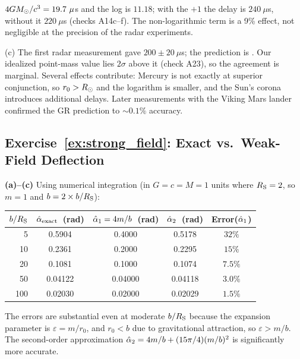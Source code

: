 \begin{annotation}
$4GM_{\odot}/c^3 = 19.7~\mu$s and the log is $11.18$; with the
$+1$ the delay is $240~\mu$s, without it $220~\mu$s (checks A14c--f).  The
non-logarithmic term is a 9\% effect, not negligible at the precision of the
radar experiments.
\end{annotation}
(c) The first radar measurement \citep{shapiro_1968} gave
$200 \pm 20~\mu$s; the prediction is \citet{shapiro_1964}.  Our idealized point-mass value lies $2\sigma$ above it
(check A23), so the agreement is marginal.  Several effects contribute:
Mercury is not exactly at superior conjunction, so $r_0 > R_{\odot}$ and the
logarithm is smaller, and the Sun's corona introduces additional delays.
Later measurements with the Viking Mars lander confirmed the GR prediction
to $\sim 0.1\%$ accuracy.

\subsection*{Exercise~\ref{ex:strong_field}: Exact vs.\ Weak-Field Deflection}

\textbf{(a)--(c)} Using numerical integration (in $G = c = M = 1$ units
where $R_{\mathrm{S}} = 2$, so $m = 1$ and $b = 2 \times b/R_{\mathrm{S}}$):

\begin{center}
\begin{tabular}{rcccc}
\toprule
$b/R_{\mathrm{S}}$ & $\hat{\alpha}_{\mathrm{exact}}$~(rad) &
$\hat{\alpha}_1 = 4m/b$~(rad) &
$\hat{\alpha}_2$~(rad) &
Error($\hat{\alpha}_1$) \\
\midrule
5   & 0.5904  & 0.4000 & 0.5178 & $32\%$ \\
10  & 0.2361  & 0.2000 & 0.2295 & $15\%$ \\
20  & 0.1081  & 0.1000 & 0.1074 & $7.5\%$ \\
50  & 0.04122 & 0.04000 & 0.04118 & $3.0\%$ \\
100 & 0.02030 & 0.02000 & 0.02029 & $1.5\%$ \\
\bottomrule
\end{tabular}
\end{center}

The errors are substantial even at moderate $b/R_{\mathrm{S}}$ because the expansion
parameter is $\varepsilon = m/r_0$, and $r_0 < b$ due to gravitational
attraction, so $\varepsilon > m/b$.  The second-order approximation
$\hat{\alpha}_2 = 4m/b + (15\pi/4)(m/b)^2$ is significantly more accurate.


